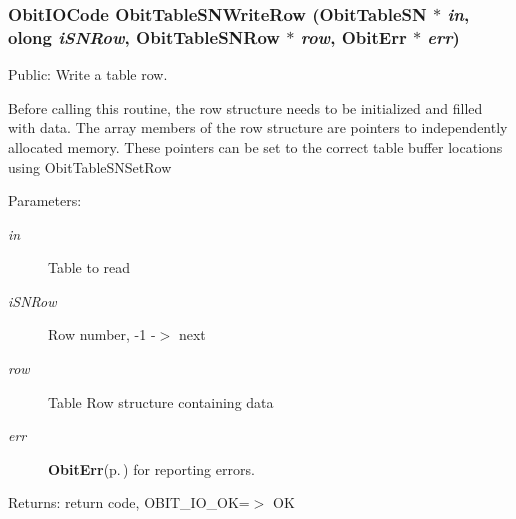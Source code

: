 \subsubsection{\setlength{\rightskip}{0pt plus 5cm}Obit\-IOCode Obit\-Table\-SNWrite\-Row ({\bf Obit\-Table\-SN} $\ast$ {\em in}, {\bf olong} {\em i\-SNRow}, {\bf Obit\-Table\-SNRow} $\ast$ {\em row}, {\bf Obit\-Err} $\ast$ {\em err})}\label{ObitTableSN_8c_a24}


Public: Write a table row. 

Before calling this routine, the row structure needs to be initialized and filled with data. The array members of the row structure are pointers to independently allocated memory. These pointers can be set to the correct table buffer locations using Obit\-Table\-SNSet\-Row \begin{Desc}
\item[Parameters:]
\begin{description}
\item[{\em in}]Table to read \item[{\em i\-SNRow}]Row number, -1 -$>$ next \item[{\em row}]Table Row structure containing data \item[{\em err}]{\bf Obit\-Err}{\rm (p.\,\pageref{structObitErr})} for reporting errors. \end{description}
\end{Desc}
\begin{Desc}
\item[Returns:]return code, OBIT\_\-IO\_\-OK=$>$ OK \end{Desc}
